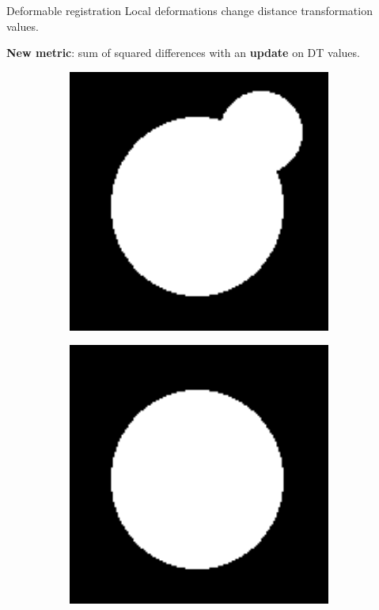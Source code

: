 \documentclass[10pt]{beamer}
\begin{document}
\begin{frame}{Deformable registration}
  Local deformations change distance transformation values.

  \vspace{0.4cm}
  
  \textbf{New metric}: sum of squared differences with an \textbf{update} on DT values.

  \begin{figure}[ht]
  \centering
  \begin{subfigure}[t]{0.2\textwidth}
    \centering
    \includegraphics[width=0.95\textwidth]{fig/registration_reference}
    \caption{}
    \label{subfig:registration_reference}
  \end{subfigure}%
  \begin{subfigure}[t]{0.2\textwidth}
    \centering
    \includegraphics[width=0.95\textwidth]{fig/registration_target}

\end{subfigure}
\end{figure}
\end{frame}
\end{document}
